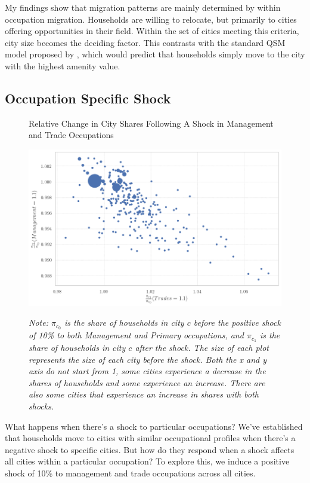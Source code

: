 \documentclass[10pt]{article}
\begin{document}
My findings show that migration patterns are mainly determined by within occupation migration. Households are willing to relocate, but primarily to cities offering opportunities in their field. Within the set of cities meeting this criteria, city size becomes the deciding factor. This contrasts with the standard QSM model proposed by \cite{redding}, which would predict that households simply move to the city with the highest amenity value.

\subsection{Occupation Specific Shock}

\begin{figure}[!htb]
    \centering
    \caption{Relative Change in City Shares Following A Shock in Management and Trade Occupations}
    \includegraphics[width=\textwidth]{../../estimations/graphs/occ_shock_t.png}
    \label{man_change_graph}
    \caption*{\small\textit{Note: $\pi_{c_0}$ is the share of households in city $c$ before the positive shock of 10\% to both Management and Primary occupations, and $\pi_{c_1}$ is the share of households in city $c$ after the shock. The size of each plot represents the size of each city before the shock. Both the x and y axis do not start from 1, some cities experience a decrease in the shares of households and some experience an increase. There are also some cities that experience an increase in shares with both shocks.}}
\end{figure}

What happens when there's a shock to particular occupations? We've established that households move to cities with similar occupational profiles when there's a negative shock to specific cities. But how do they respond when a shock affects all cities within a particular occupation? To explore this, we induce a positive shock of 10\% to management and trade occupations across all cities.
\end{document}
